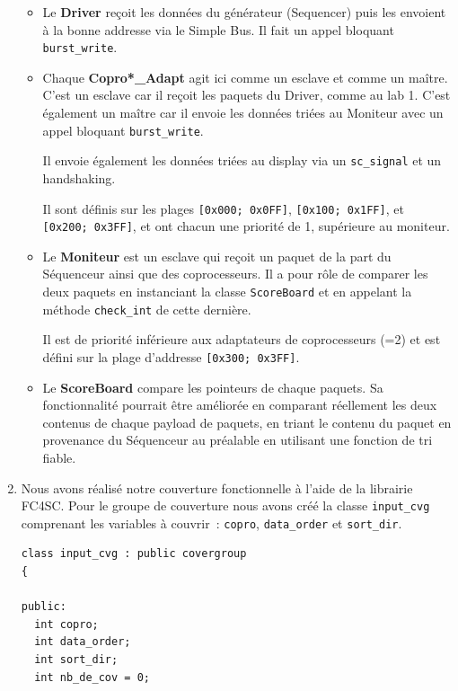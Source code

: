 \documentclass[a4paper, 10pt]{article}
\begin{document}
\begin{enumerate}
\begin{itemize}
				\item Le \textbf{Driver} reçoit les données du générateur (Sequencer)
					puis les envoient à la bonne addresse via le Simple Bus. Il fait un
					appel bloquant \texttt{burst\_write}.

				\item Chaque \textbf{Copro*\_Adapt} agit ici comme un esclave et comme
					un maître. C'est un esclave car il reçoit les paquets du Driver,
					comme au lab 1. C'est également un maître car il envoie les
					données triées au Moniteur avec un appel bloquant
					\texttt{burst\_write}.
					
					Il envoie également les données triées au display via un
					\texttt{sc\_signal} et un handshaking.

					Il sont définis sur les plages \texttt{[0x000; 0x0FF]},
					\texttt{[0x100; 0x1FF]}, et \texttt{[0x200; 0x3FF]}, et ont chacun une
					priorité de 1, supérieure au moniteur.

				\item Le \textbf{Moniteur} est un esclave qui reçoit un paquet de la
					part du Séquenceur ainsi que des coprocesseurs. Il a pour rôle de
					comparer les deux paquets en instanciant la classe
					\texttt{ScoreBoard} et en appelant la méthode \texttt{check\_int}
					de cette dernière.

					Il est de priorité inférieure aux adaptateurs de coprocesseurs (=2) et
					est défini sur la plage d'addresse \texttt{[0x300; 0x3FF]}.

				\item Le \textbf{ScoreBoard} compare les pointeurs de chaque paquets.
					Sa fonctionnalité pourrait être améliorée en comparant réellement
					les deux contenus de chaque payload de paquets, en triant le
					contenu du paquet en provenance du Séquenceur au préalable en
					utilisant une fonction de tri fiable.
		\end{itemize}

	\item Nous avons réalisé notre couverture fonctionnelle à l’aide de la librairie
		FC4SC.  Pour le groupe de couverture nous avons créé la classe \texttt{input\_cvg}
		comprenant les variables à couvrir : \texttt{copro}, \texttt{data\_order} et
		\texttt{sort\_dir}.

		\begin{lstlisting}[numbers=none]
class input_cvg : public covergroup
{

public:
  int copro;
  int data_order;
  int sort_dir;
  int nb_de_cov = 0;
		\end{lstlisting}


\end{enumerate}
\end{document}
